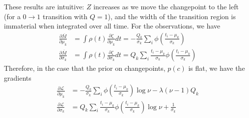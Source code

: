 \documentclass[11pt]{article}
\begin{document}
These results are intuitive: $Z$ increases as we move the changepoint to the left (for a $0 \rightarrow 1$ transition with $Q = 1$), and the width of the transition region is immaterial when integrated over all time. For the observations, we have
\begin{align}
    \frac{\partial \overline{M}}{\partial \mu_k} &= \int \rho(t) \frac{\partial \zeta}{\partial \mu_k} dt = -\frac{Q_k}{\sigma_k}\sum_i \phi\left( \frac{t_i - \mu_k}{\sigma_k}\right) \\
    \frac{\partial \overline{M}}{\partial \sigma_k} &= \int \rho(t) \frac{\partial \zeta}{\partial \sigma_k} dt = Q_k\sum_i \frac{t_i - \mu_k}{\sigma_k}\phi\left( \frac{t_i - \mu_k}{\sigma_k}\right)
\end{align}
Therefore, in the case that the prior on changepoints, $p(c)$ is flat, we have the gradients
\begin{align}
    \frac{\partial \mathcal{L}}{\partial \mu_k} &= -\frac{Q_k}{\sigma_k}\sum_i \phi\left( \frac{t_i - \mu_k}{\sigma_k}\right) \log \nu
    - \lambda (\nu - 1) Q_k \\
    \frac{\partial \mathcal{L}}{\partial \sigma_k} &=
    Q_k\sum_i \frac{t_i - \mu_k}{\sigma_k}\phi\left( \frac{t_i - \mu_k}{\sigma_k}\right) \log \nu + \frac{1}{\sigma_k}
\end{align}
\end{document}
